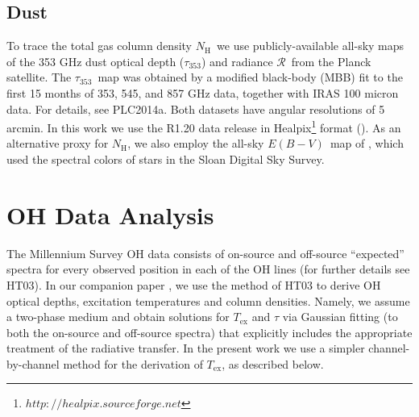 \documentclass[preprint]{emulateapj}
\def\ebv{$E(B{-}V)$}
\def\NH{$N_\mathrm{H}$}
\def\t353{$\tau_{353}$}
\def\rad{$\mathcal{R}$}
\begin{document}
\subsection{Dust}
\label{subsec:data_planck_iras}
To trace the total gas column density \NH\ we use publicly-available all-sky maps of the 353 GHz dust optical depth (\t353) and radiance \rad\ from the Planck satellite. The \t353\ map was obtained by a modified black-body (MBB) fit to the first 15 months of 353, 545, and 857 GHz data, together with IRAS 100 micron data. For details, see PLC2014a. Both datasets have angular resolutions of 5 arcmin. In this work we use the R1.20 data release in Healpix\footnote{$http://healpix.sourceforge.net$} format (\citealt{Gorski2005}). %
As an alternative proxy for \NH, we also employ the all-sky \ebv\ map of \citet{Schlafly2011}, which used the spectral colors of stars in the Sloan Digital Sky Survey. 

\section{OH Data Analysis}
\label{sec:derive_tex}

The Millennium Survey OH data consists of on-source and off-source ``expected'' spectra for every observed position in each of the OH lines (for further details see HT03). In our companion paper \citet{Li2017}, we use the method of HT03 to derive OH optical depths, excitation temperatures and column densities. Namely, we assume a two-phase medium and obtain solutions for $T_\mathrm{ex}$ and $\tau$ via Gaussian fitting (to both the on-source and off-source spectra) that explicitly includes the appropriate treatment of the radiative transfer. In the present work we use a simpler channel-by-channel method for the derivation of $T_\mathrm{ex}$, as described below. 
\end{document}
